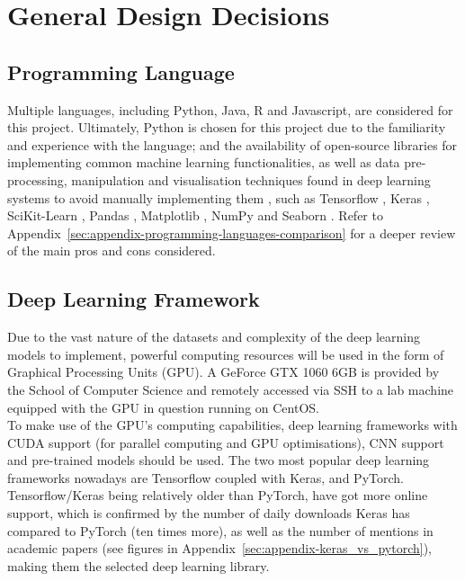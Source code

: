 
\section{General Design Decisions}

\subsection{Programming Language}

Multiple languages, including Python, Java, R and Javascript, are considered for this project. Ultimately, Python is chosen for this project due to the familiarity and experience with the language; and the availability of open-source libraries for implementing common machine learning functionalities, as well as data pre-processing, manipulation and visualisation techniques found in deep learning systems to avoid manually implementing them \citep{raschka2017python}, such as Tensorflow \citep{tensorflow2015-whitepaper}, Keras \citep{chollet2015keras}, SciKit-Learn \citep{scikit-learn}, Pandas \citep{reback2020pandas}, Matplotlib \citep{Hunter:2007}, NumPy \citep{numpy} and Seaborn \citep{seaborn}. Refer to Appendix~\ref{sec:appendix-programming-languages-comparison} for a deeper review of the main pros and cons considered.

\subsection{Deep Learning Framework}

Due to the vast nature of the datasets and complexity of the deep learning models to implement, powerful computing resources will be used in the form of Graphical Processing Units (GPU). A GeForce GTX 1060 6GB is provided by the School of Computer Science and remotely accessed via SSH to a lab machine equipped with the GPU in question running on CentOS.\\

To make use of the GPU's computing capabilities, deep learning frameworks with CUDA support (for parallel computing and GPU optimisations), CNN support and pre-trained models should be used. The two most popular deep learning frameworks nowadays are Tensorflow coupled with Keras, and PyTorch. Tensorflow/Keras being relatively older than PyTorch, have got more online support, which is confirmed by the number of daily downloads Keras has compared to PyTorch (ten times more), as well as the number of mentions in academic papers (see figures  in Appendix~\ref{sec:appendix-keras_vs_pytorch}), making them the selected deep learning library.

